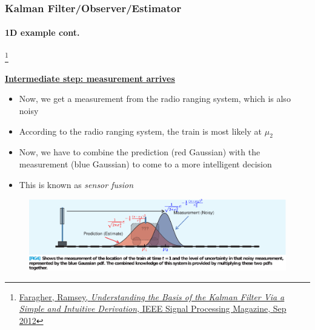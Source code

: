 \begin{frame}[plain]
\frametitle{Kalman Filter/Observer/Estimator}
\framesubtitle{1D example \tiny cont.}

\footnote{\tiny\hspace{-0.23in} \href{http://www.cl.cam.ac.uk/~rmf25/papers/Understanding the Basis of the Kalman Filter.pdf}{Faragher, Ramsey, \emph{Understanding the Basis of the Kalman Filter Via a Simple and Intuitive Derivation}, IEEE Signal Processing Magazine, Sep 2012}}
\scriptsize
\begin{changemargin}{-1.3in}{0in}
\underline{\textbf{Intermediate step: measurement arrives}}
\begin{itemize}\scriptsize
\item Now, we get a measurement from the radio ranging system, which is also noisy
\item According to the radio ranging system, the train is most likely at  $\mu_2$
\item Now, we have to combine the prediction (red Gaussian) with the measurement (blue Gaussian) to come to a more intelligent decision
\item This is known as \emph{sensor fusion}
\end{itemize}
\begin{figure}[h]
\centering
\includegraphics[width=1.35\textwidth]{figs/2012_MAG_Understanding_the_Basis_of_the_Kalman_Filter_fig4.pdf}
\end{figure}
\end{changemargin}
\end{frame}


